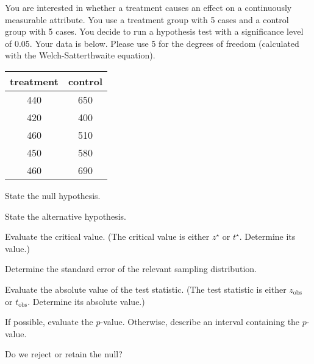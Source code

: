 
\begin{question}
You are interested in whether a treatment causes an effect on a
continuously measurable attribute. You use a treatment group with 5
cases and a control group with 5 cases. You decide to run a hypothesis
test with a significance level of 0.05. Your data is below. Please use 5
for the degrees of freedom (calculated with the Welch-Satterthwaite
equation).

\begin{longtable}[]{@{}cc@{}}
\toprule
treatment & control\tabularnewline
\midrule
\endhead
440 & 650\tabularnewline
420 & 400\tabularnewline
460 & 510\tabularnewline
450 & 580\tabularnewline
460 & 690\tabularnewline
\bottomrule
\end{longtable}
\begin{answerlist}
  \item State the null hypothesis.
  \item State the alternative hypothesis.
  \item Evaluate the critical value. (The critical value is either \(z^\star\)
or \(t^\star\). Determine its value.)
  \item Determine the standard error of the relevant sampling distribution.
  \item Evaluate the absolute value of the test statistic. (The test statistic
is either \(z_\text{obs}\) or \(t_\text{obs}\). Determine its absolute
value.)
  \item If possible, evaluate the \(p\)-value. Otherwise, describe an interval
containing the \(p\)-value.
  \item Do we reject or retain the null?
\end{answerlist}
\end{question}


